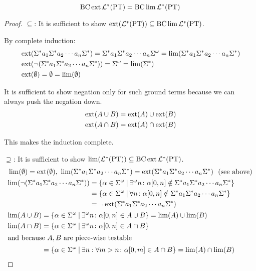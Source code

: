 \begin{theorem}
\label{thm.PT}
\[ \operatorname{BC} \operatorname{ext} \mathcal{L}^* (\textup{\textrm{PT}}) = \operatorname{BC} \lim \mathcal{L}^* (\textup{\textrm{PT}}) \]
\begin{proof}
$\subseteq$: It is sufficient to show $\operatorname{ext}(\mathcal{L}^* (\textup{\textrm{PT}})) \subseteq \operatorname{BC} \lim \mathcal{L}^* (\textup{\textrm{PT}})$.

By complete induction:
\begin{align*}
& \operatorname{ext}(\Sigma^* a_1 \Sigma^* a_2 \dotsb a_n \Sigma^*) = \Sigma^* a_1 \Sigma^* a_2 \dotsb a_n \Sigma^\omega = \lim(\Sigma^* a_1 \Sigma^* a_2 \dotsb a_n \Sigma^*) \\
& \operatorname{ext}( \neg ( \Sigma^* a_1 \Sigma^* a_2 \dotsb a_n \Sigma^* )) = \Sigma^\omega = \lim( \Sigma^* ) \\
& \operatorname{ext}( \emptyset ) = \emptyset = \lim(\emptyset)
\end{align*}

It is sufficient to show negation only for such ground terms because we can always push the negation down.
\begin{align*}
& \operatorname{ext}(A \cup B) = \operatorname{ext}(A) \cup \operatorname{ext}(B) \\
& \operatorname{ext}(A \cap B) = \operatorname{ext}(A) \cap \operatorname{ext}(B)
\end{align*}

This makes the induction complete.

$\supseteq$: It is sufficient to show $\lim(\mathcal{L}^* (\textup{\textrm{PT}})) \subseteq \operatorname{BC} \operatorname{ext} \mathcal{L}^* (\textup{\textrm{PT}})$.
\begin{align*}
& \lim(\emptyset) = \ext(\emptyset), \ \lim(\Sigma^* a_1 \Sigma^* a_2 \dotsb a_n \Sigma^*) = \ext(\Sigma^* a_1 \Sigma^* a_2 \dotsb a_n \Sigma^*) \ \ \text{(see above)} \\
& \begin{aligned}
\lim( \neg ( \Sigma^* a_1 \Sigma^* a_2 \dotsb a_n \Sigma^* ) ) & = \Set{ \alpha \in \Sigma^\omega }{ \exists^\omega n \colon \alpha [0,n] \notin \Sigma^* a_1 \Sigma^* a_2 \dotsb a_n \Sigma^* } \\
& = \Set{ \alpha \in \Sigma^\omega }{ \forall n \colon \alpha [0,n] \notin \Sigma^* a_1 \Sigma^* a_2 \dotsb a_n \Sigma^* } \\
& = \neg \ext( \Sigma^* a_1 \Sigma^* a_2 \dotsb a_n \Sigma^* )
\end{aligned} \\
& \begin{aligned}
\lim(A \cup B) & = \Set{ \alpha \in \Sigma^\omega }{ \exists^\omega n \colon \alpha[0,n] \in A \cup B } = \lim(A) \cup \lim(B) \\
\lim(A \cap B) & = \Set{ \alpha \in \Sigma^\omega }{ \exists^\omega n \colon \alpha[0,n] \in A \cap B } \\
\intertext{and because $A,B$ are piece-wise testable}
& = \Set{ \alpha \in \Sigma^\omega }{ \exists n : \forall m > n \colon \alpha[0,m] \in A \cap B } = \lim(A) \cap \lim(B)
\end{aligned}
\end{align*}
\end{proof}
\end{theorem}

